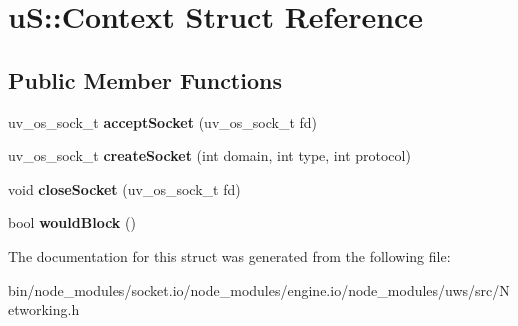 \hypertarget{structu_s_1_1_context}{}\section{uS\+:\+:Context Struct Reference}
\label{structu_s_1_1_context}
\subsection*{Public Member Functions}
\begin{DoxyCompactItemize}
\item 
\mbox{\label{structu_s_1_1_context_a75a7d154f3b439e2f203f315ecce2803}} 
uv\+\_\+os\+\_\+sock\+\_\+t {\bfseries accept\+Socket} (uv\+\_\+os\+\_\+sock\+\_\+t fd)
\item 
\mbox{\label{structu_s_1_1_context_a54c91da2eeef63c4127bf417ba387c74}} 
uv\+\_\+os\+\_\+sock\+\_\+t {\bfseries create\+Socket} (int domain, int type, int protocol)
\item 
\mbox{\label{structu_s_1_1_context_acba8f4f3c02db7a42864b9084c7186fa}} 
void {\bfseries close\+Socket} (uv\+\_\+os\+\_\+sock\+\_\+t fd)
\item 
\mbox{\label{structu_s_1_1_context_ac52be5687ad9dcd4388d7225003dabf6}} 
bool {\bfseries would\+Block} ()
\end{DoxyCompactItemize}


The documentation for this struct was generated from the following file\+:\begin{DoxyCompactItemize}
\item 
bin/node\+\_\+modules/socket.\+io/node\+\_\+modules/engine.\+io/node\+\_\+modules/uws/src/Networking.\+h\end{DoxyCompactItemize}
